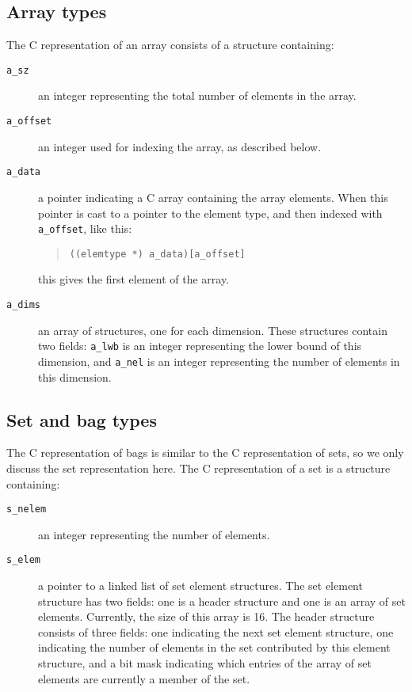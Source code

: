\documentclass[10pt]{article}
\begin{document}
\subsection{Array types}
The C representation of an array consists of a structure containing:
\begin{description}
\item[{\tt a\_sz}]
an integer representing the total number of elements in the array.
\item[{\tt a\_offset}]
an integer used for indexing the array, as described below.
\item[{\tt a\_data}]
a pointer indicating a C array containing the array elements.
When this pointer is cast to a pointer to the element type, and then
indexed with \verb+a_offset+, like this:
\begin{quote}
\begin{verbatim}
((elemtype *) a_data)[a_offset]
\end{verbatim}
\end{quote}
this gives the first element of the array.
\item[{\tt a\_dims}]
an array of structures, one for each dimension.
These structures contain two fields: \verb+a_lwb+ is an integer
representing the lower bound of this dimension, and \verb+a_nel+
is an integer representing the number of elements in this dimension.
\end{description}

\subsection{Set and bag types}
The C representation of bags is similar to the C representation of sets,
so we only discuss the set representation here.
The C representation of a set is a structure containing:
\begin{description}
\item[{\tt s\_nelem}]
an integer representing the number of elements.
\item[{\tt s\_elem}]
a pointer to a linked list of set element structures.
The set element structure has two fields: one is a header structure and
one is an array of set elements.
Currently, the size of this array is 16. The header structure consists of
three fields: one indicating the next set element structure, one indicating
the number of elements in the set contributed by this element structure,
and a bit mask indicating which entries of the array of set elements are
currently a member of the set.
\end{description}
\end{document}

